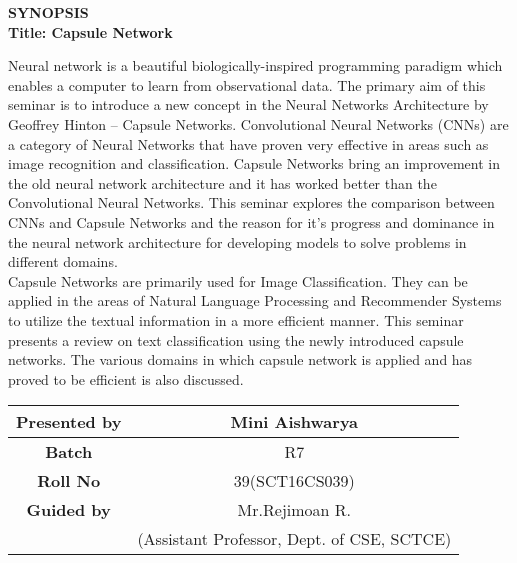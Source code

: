 \documentclass[a4 paper, 12pt]{article}
\begin{document}
\begin{center}
\Large{\textbf{SYNOPSIS}}
\\
\textbf{Title: Capsule Network}
\end{center}
\begin{flushleft}
Neural network is a beautiful biologically-inspired programming paradigm which enables a computer to learn from observational data. The primary aim of this seminar is to introduce a new concept in the Neural Networks Architecture by Geoffrey Hinton – Capsule Networks. Convolutional Neural Networks (CNNs) are a category of Neural Networks that have proven very effective in areas such as image recognition and classification. Capsule Networks bring an improvement in the old neural
network architecture and it has worked better than the Convolutional Neural Networks. This seminar explores the comparison between CNNs and Capsule Networks and the reason for it's progress and dominance in the neural network architecture for developing models to solve problems in different domains.
\\
\vspace{6pt}
Capsule Networks are primarily used for Image Classification. They can be applied in the areas of Natural Language Processing and Recommender Systems to utilize the textual information in a more efficient manner. This seminar presents a review on text classification using the newly introduced capsule networks. The various domains in which capsule network is applied and has proved to be efficient is also discussed. 
\end{flushleft}

\begin{flushleft}
\vspace{1pt}
\begin{tabular}{|c|c|}
\hline
\textbf{Presented by} \hspace{70pt} & Mini Aishwarya \\
\hline
\textbf{Batch} \hspace{70pt} & R7 \\
\hline
\textbf{Roll No} \hspace{70pt} &  39(SCT16CS039) \\
\hline
\textbf{Guided by} \hspace{70pt} & Mr.Rejimoan R. \\
 & (Assistant Professor, Dept. of CSE, SCTCE) \\
\hline
\end{tabular}
\end{flushleft}
\end{document}
